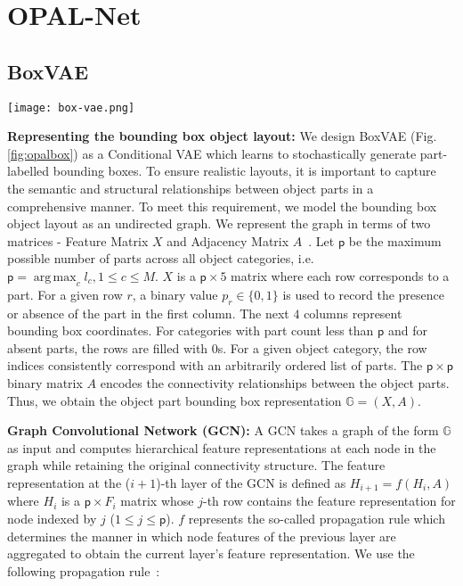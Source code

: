 \documentclass[runningheads]{llncs}
\DeclareMathOperator*{\argmax}{arg\,max}
\begin{document}
\section{OPAL-Net}
\label{sec:OPAL-Net}

\subsection{BoxVAE}
\label{sec:boxvae}

\begin{figure*}[!ht]
  \centering
  \texttt{[image: box-vae.png]}
  \caption{The architecture for BoxVAE (Sec. \ref{sec:boxvae}) which is trained to generate a graph representation of the object's bounding box layout. The pink arrows indicate the data flow for the generative model.}
  \label{fig:opalbox}
\end{figure*}

\noindent \textbf{Representing the bounding box object layout:} We design BoxVAE (Fig. \ref{fig:opalbox}) as a Conditional VAE which learns to stochastically generate part-labelled bounding boxes. To ensure realistic layouts, it is important to capture the semantic and structural relationships between object parts in a comprehensive manner. To meet this requirement, we model the bounding box object layout as an undirected graph. We represent the graph in terms of two matrices - Feature Matrix $X$ and Adjacency Matrix $A$~\cite{kipf2016variational,zhang2018graph}. Let $\mathsf{p}$ be the maximum possible number of parts across all object categories, i.e. $\mathsf{p} = \argmax_{c} l_c, 1 \leqslant c \leqslant M$. $X$ is a $\mathsf{p} \times 5$ matrix where each row corresponds to a part. For a given row $r$, a binary value $p_r \in \{0,1\}$ is used to record the presence or absence of the part in the first column. The next $4$ columns represent bounding box coordinates. For categories with part count less than $\mathsf{p}$ and for absent parts, the rows are filled with $0$s. For a given object category, the row indices consistently correspond with an arbitrarily ordered list of parts. The $\mathsf{p} \times \mathsf{p}$ binary matrix $A$ encodes the connectivity relationships between the object parts. Thus, we obtain the object part bounding box representation $\mathbb{G} = (X,A)$.

\noindent \textbf{Graph Convolutional Network (GCN):} A GCN takes a graph of the form $\mathbb{G}$ as input and computes hierarchical feature representations at each node in the graph while retaining the original connectivity structure. The feature representation at the ($i+1$)-th layer of the GCN is defined as  $H_{i+1} = f(H_i, A)$ where $H_i$ is a $\mathsf{p} \times F_i$  matrix whose $j$-th row contains the feature representation for node indexed by $j$ ($1 \leqslant j \leqslant \mathsf{p}$). $f$ represents the so-called propagation rule which determines the manner in which node features of the previous layer are aggregated to obtain the current layer's feature representation. We use the following propagation rule~\cite{kipf2017semi}:
\end{document}
